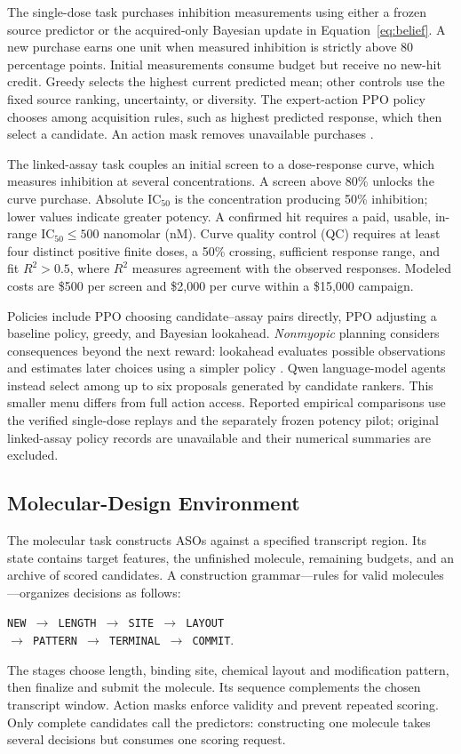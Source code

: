 \documentclass[letterpaper]{article}
\begin{document}
The single-dose task purchases inhibition measurements using either a frozen source predictor or the acquired-only Bayesian update in Equation~\ref{eq:belief}. A new purchase earns one unit when measured inhibition is strictly above 80 percentage points. Initial measurements consume budget but receive no new-hit credit. Greedy selects the highest current predicted mean; other controls use the fixed source ranking, uncertainty, or diversity. The expert-action PPO policy chooses among acquisition rules, such as highest predicted response, which then select a candidate. An action mask removes unavailable purchases \citep{ppo,masking}.

The linked-assay task couples an initial screen to a dose-response curve, which measures inhibition at several concentrations. A screen above 80\% unlocks the curve purchase. Absolute $\mathrm{IC}_{50}$ is the concentration producing 50\% inhibition; lower values indicate greater potency. A confirmed hit requires a paid, usable, in-range $\mathrm{IC}_{50}\leq500$ nanomolar (nM). Curve quality control (QC) requires at least four distinct positive finite doses, a 50\% crossing, sufficient response range, and fit $R^2>0.5$, where $R^2$ measures agreement with the observed responses. Modeled costs are \$500 per screen and \$2,000 per curve within a \$15,000 campaign.

Policies include PPO choosing candidate--assay pairs directly, PPO adjusting a baseline policy, greedy, and Bayesian lookahead. \emph{Nonmyopic} planning considers consequences beyond the next reward: lookahead evaluates possible observations and estimates later choices using a simpler policy \citep{jiang,nguyen}. Qwen language-model agents instead select among up to six proposals generated by candidate rankers. This smaller menu differs from full action access. Reported empirical comparisons use the verified single-dose replays and the separately frozen potency pilot; original linked-assay policy records are unavailable and their numerical summaries are excluded.

\subsection{Molecular-Design Environment}
The molecular task constructs ASOs against a specified transcript region. Its state contains target features, the unfinished molecule, remaining budgets, and an archive of scored candidates. A construction grammar---rules for valid molecules---organizes decisions as follows:
\begin{center}
\texttt{NEW $\to$ LENGTH $\to$ SITE $\to$ LAYOUT}\\
\texttt{$\to$ PATTERN $\to$ TERMINAL $\to$ COMMIT}.
\end{center}
The stages choose length, binding site, chemical layout and modification pattern, then finalize and submit the molecule. Its sequence complements the chosen transcript window. Action masks enforce validity and prevent repeated scoring. Only complete candidates call the predictors: constructing one molecule takes several decisions but consumes one scoring request.
\end{document}
